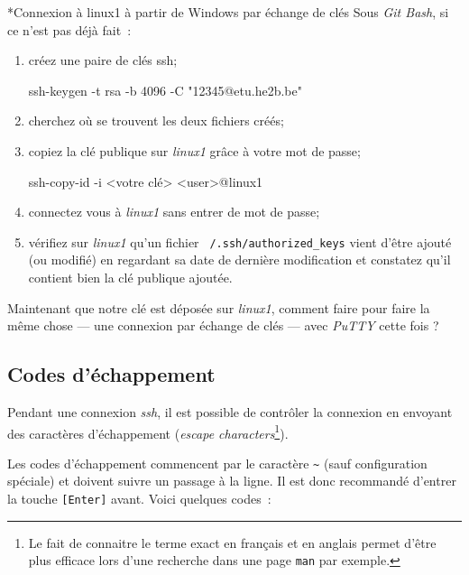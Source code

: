 \documentclass[a4paper,11pt]{article}
\begin{document}
\clearpage
\begin{Exercice}*{Connexion à linux1 à partir de Windows par échange de clés}
	Sous \textit{Git Bash}, si ce n'est pas déjà fait~: 

	\begin{enumerate}
		\item créez une paire de clés ssh;
			\begin{term}
				ssh-keygen -t rsa -b 4096 -C "12345@etu.he2b.be"
			\end{term}

		\item cherchez où se trouvent les deux fichiers créés;
		\item copiez la clé publique sur \textit{linux1} grâce à votre mot de passe;
			\begin{term}
				ssh-copy-id -i <votre clé> <user>@linux1
			\end{term}

		\item connectez vous à \textit{linux1} sans entrer de mot de passe;
		
		\item vérifiez sur \textit{linux1} qu'un fichier
			\texttt{~/.ssh/authorized\_keys} vient d'être ajouté (ou modifié) en
			regardant sa date de dernière modification et constatez qu'il contient
			bien la clé publique ajoutée.	
	\end{enumerate}

	Maintenant que notre clé est déposée sur \textit{linux1}, comment faire pour
	faire la même chose — une connexion par échange de clés — avec
	\textit{PuTTY} cette fois ?

\end{Exercice}



\subsection{Codes d'échappement}


Pendant une connexion \textit{ssh}, il est possible de contrôler la connexion en
envoyant des caractères d'échappement (\textit{escape characters}\footnote{Le
	fait de connaitre le terme exact en français et en anglais permet d'être
	plus efficace lors d'une recherche dans une page \texttt{man} par exemple.
}). 

Les codes d'échappement commencent par le caractère \texttt{\textasciitilde}
(sauf configuration spéciale) et doivent suivre un passage à la ligne. Il est donc
recommandé d'entrer la touche \texttt{[Enter]} avant. Voici quelques codes~:
\end{document}

